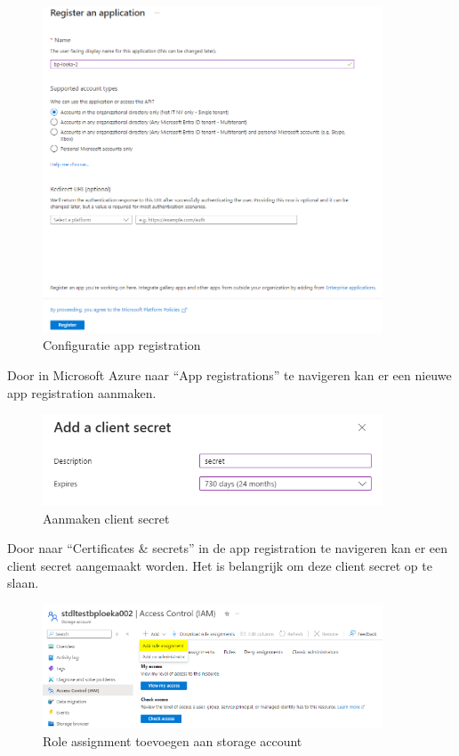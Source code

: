 \begin{figure}[H]
    \centering
    \includegraphics[width=0.9\textwidth]{./graphics/databricks/connection_2.png}
    \caption{Configuratie app registration}
\end{figure}

Door in Microsoft Azure naar ``App registrations'' te navigeren kan er een nieuwe app registration aanmaken.

\begin{figure}[H]
    \centering
    \includegraphics[width=0.9\textwidth]{./graphics/databricks/connection_3.png}
    \caption{Aanmaken client secret}
\end{figure}

Door naar ``Certificates \& secrets'' in de app registration te navigeren kan er een client secret aangemaakt worden. Het is belangrijk om deze client secret op te slaan.

\begin{figure}[H]
    \centering
    \includegraphics[width=0.9\textwidth]{./graphics/databricks/connection_4.png}
    \caption{Role assignment toevoegen aan storage account}
\end{figure}

